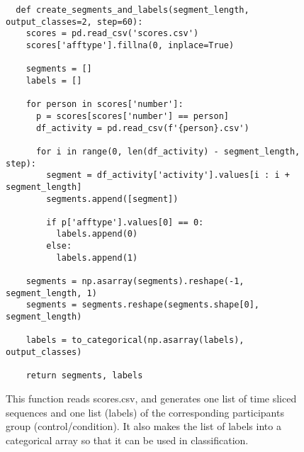\begin{figure}[h]
\begin{code}
  \begin{verbatim}
  def create_segments_and_labels(segment_length, output_classes=2, step=60):
    scores = pd.read_csv('scores.csv')
    scores['afftype'].fillna(0, inplace=True)
    
    segments = []
    labels = []

    for person in scores['number']:
      p = scores[scores['number'] == person]
      df_activity = pd.read_csv(f'{person}.csv')

      for i in range(0, len(df_activity) - segment_length, step):
        segment = df_activity['activity'].values[i : i + segment_length]
        segments.append([segment])

        if p['afftype'].values[0] == 0: 
          labels.append(0)
        else:
          labels.append(1)

    segments = np.asarray(segments).reshape(-1, segment_length, 1)
    segments = segments.reshape(segments.shape[0], segment_length)

    labels = to_categorical(np.asarray(labels), output_classes)
    
    return segments, labels
  \end{verbatim}
  \caption{This function reads scores.csv, and generates one list of time sliced sequences and one list (labels) of the corresponding participants group (control/condition). It also makes the list of labels into a categorical array so that it can be used in classification.}
  \label{code:reading_dataset}
\end{code}
\end{figure}